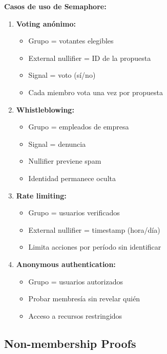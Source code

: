 \documentclass[11pt,a4paper,twoside]{book}
\theoremstyle{definition}
\theoremstyle{remark}
\begin{document}
\begin{keyidea}
\textbf{Casos de uso de Semaphore:}

\begin{enumerate}
    \item \textbf{Voting anónimo:}
    \begin{itemize}
        \item Grupo = votantes elegibles
        \item External nullifier = ID de la propuesta
        \item Signal = voto (sí/no)
        \item Cada miembro vota una vez por propuesta
    \end{itemize}
    
    \item \textbf{Whistleblowing:}
    \begin{itemize}
        \item Grupo = empleados de empresa
        \item Signal = denuncia
        \item Nullifier previene spam
        \item Identidad permanece oculta
    \end{itemize}
    
    \item \textbf{Rate limiting:}
    \begin{itemize}
        \item Grupo = usuarios verificados
        \item External nullifier = timestamp (hora/día)
        \item Limita acciones por período sin identificar
    \end{itemize}
    
    \item \textbf{Anonymous authentication:}
    \begin{itemize}
        \item Grupo = usuarios autorizados
        \item Probar membresía sin revelar quién
        \item Acceso a recursos restringidos
    \end{itemize}
\end{enumerate}
\end{keyidea}

\subsection{Non-membership Proofs}
\end{document}
